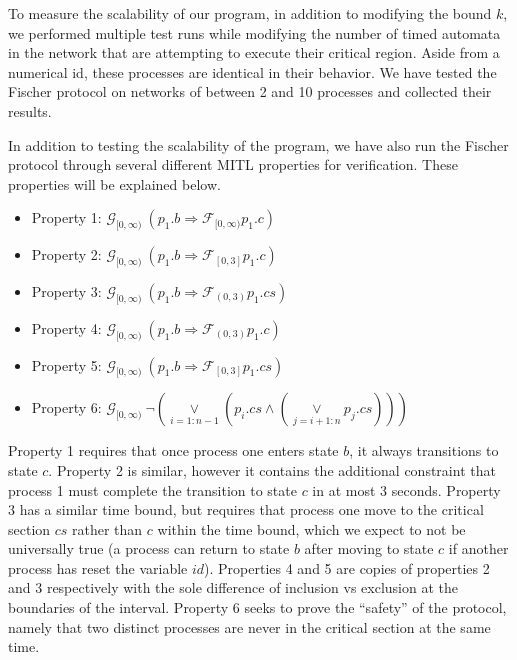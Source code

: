 \documentclass[a4paper,12pt]{article}
\begin{document}
To measure the scalability of our program, in addition to modifying the bound
\(k\), we performed multiple test runs while modifying the number of timed
automata in the network that are attempting to execute their critical region.
Aside from a numerical id, these processes are identical in their behavior. We
have tested the Fischer protocol on networks of between 2 and 10 processes and
collected their results.

In addition to testing the scalability of the program, we have also run the
Fischer protocol through several different MITL properties for verification.
These properties will be explained below.

\begin{itemize}
\item Property 1: \(\mathcal{G}_{[0,\infty)}\ (p_1.b \Rightarrow \mathcal{F}_{[0,\infty)}p_1.c)\)
\item Property 2: \(\mathcal{G}_{[0,\infty)}\ (p_1.b \Rightarrow \mathcal{F}_{[0,3]}p_1.c)\)
\item Property 3: \(\mathcal{G}_{[0,\infty)}\ (p_1.b \Rightarrow \mathcal{F}_{(0,3)}p_1.cs)\)
\item Property 4: \(\mathcal{G}_{[0,\infty)}\ (p_1.b \Rightarrow \mathcal{F}_{(0,3)}p_1.c)\)
\item Property 5: \(\mathcal{G}_{[0,\infty)}\ (p_1.b \Rightarrow \mathcal{F}_{[0,3]}p_1.cs)\)
\item Property 6: \(\mathcal{G}_{[0,\infty)}\ \neg (\underset{i=1:n-1}{\lor} (p_i.cs \land (\underset{j=i+1:n}{\lor} p_j.cs )))\)
\end{itemize}


Property 1 requires that once process one enters state \(b\), it always
transitions to state \(c\). Property 2 is similar, however it contains the
additional constraint that process 1 must complete the transition to state \(c\)
in at most 3 seconds. Property 3 has a similar time bound, but requires that
process one move to the critical section \(cs\) rather than \(c\) within the
time bound, which we expect to not be universally true (a process can return to
state \(b\) after moving to state \(c\) if another process has reset the
variable \(id\)). Properties 4 and 5 are copies of properties 2 and 3
respectively with the sole difference of inclusion vs exclusion at the
boundaries of the interval. Property 6 seeks to prove the ``safety'' of the
protocol, namely that two distinct processes are never in the critical section
at the same time.
\end{document}
